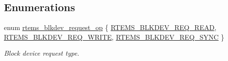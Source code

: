 \subsection*{Enumerations}
\begin{DoxyCompactItemize}
\item 
enum \mbox{\hyperlink{group__rtems__blkdev_ga36465495f1b9e28347838751ca90f0fe}{rtems\+\_\+blkdev\+\_\+request\+\_\+op}} \{ \mbox{\hyperlink{group__rtems__blkdev_gga36465495f1b9e28347838751ca90f0fea093ae86fe53f5ba14f85119f890c05ca}{R\+T\+E\+M\+S\+\_\+\+B\+L\+K\+D\+E\+V\+\_\+\+R\+E\+Q\+\_\+\+R\+E\+AD}}, 
\mbox{\hyperlink{group__rtems__blkdev_gga36465495f1b9e28347838751ca90f0feadd7b428e4168a2256b2797fff07b22e7}{R\+T\+E\+M\+S\+\_\+\+B\+L\+K\+D\+E\+V\+\_\+\+R\+E\+Q\+\_\+\+W\+R\+I\+TE}}, 
\mbox{\hyperlink{group__rtems__blkdev_gga36465495f1b9e28347838751ca90f0feaa2108d42eb1d1d49a81025f6022fa35e}{R\+T\+E\+M\+S\+\_\+\+B\+L\+K\+D\+E\+V\+\_\+\+R\+E\+Q\+\_\+\+S\+Y\+NC}}
 \}
\begin{DoxyCompactList}\small\item\em Block device request type. \end{DoxyCompactList}\end{DoxyCompactItemize}
